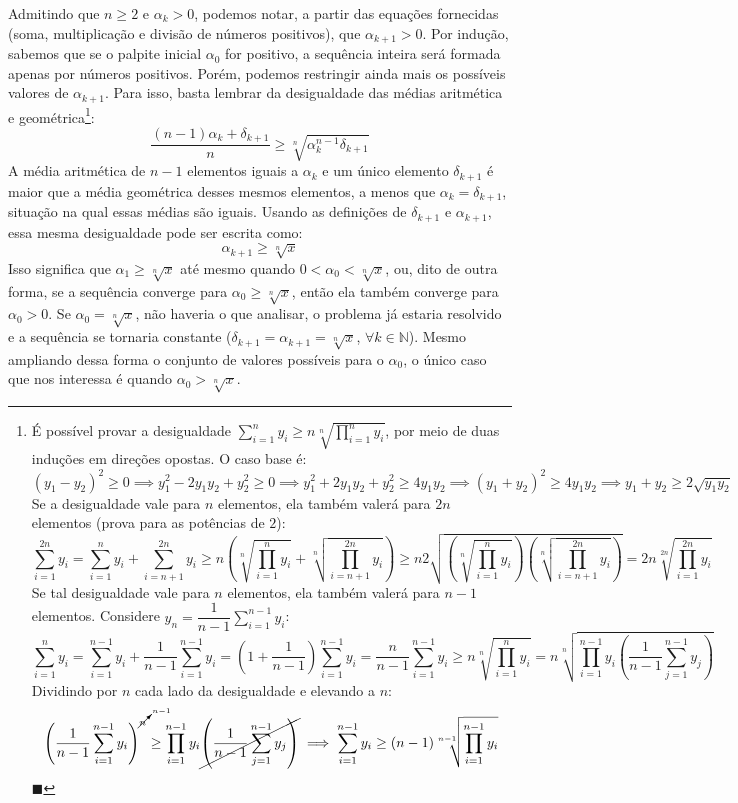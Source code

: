 \documentclass{article}
\begin{document}
Admitindo que $n \ge 2$ e $\alpha_k > 0$,
podemos notar, a partir das equações fornecidas
(soma, multiplicação e divisão de números positivos),
que $\alpha_{k+1} > 0$.
Por indução, sabemos que se o palpite inicial $\alpha_0$ for positivo,
a sequência inteira será formada apenas por números positivos.
Porém, podemos restringir ainda mais
os possíveis valores de $\alpha_{k+1}$.
Para isso, basta lembrar
da desigualdade das médias aritmética e geométrica\footnote{
  É possível provar a desigualdade
  $\sum_{i=1}^n y_i \ge n \sqrt[n]{\prod_{i=1}^n y_i}$,
  por meio de duas induções em direções opostas.
  O caso base é:
  \[
    (y_1 - y_2)^2 \ge 0
    \implies y_1^2 - 2 y_1 y_2 + y_2^2 \ge 0
    \implies y_1^2 + 2 y_1 y_2 + y_2^2 \ge 4 y_1 y_2
    \implies (y_1 + y_2)^2 \ge 4 y_1 y_2
    \implies y_1 + y_2 \ge 2 \sqrt{y_1 y_2}
  \]
  Se a desigualdade vale para $n$ elementos,
  ela também valerá para $2n$ elementos
  (prova para as potências de $2$):
  \[
    \sum_{i=1}^{2n} y_i
    = \sum_{i=1}^{n} y_i + \sum_{i=n+1}^{2n} y_i
    \ge n \left( \sqrt[n]{\prod_{i=1}^n y_i}
               + \sqrt[n]{\prod_{i=n+1}^{2n} y_i} \right)
    \ge n 2 \sqrt{ \left( \sqrt[n]{\prod_{i=1}^n y_i} \right)
                   \left( \sqrt[n]{\prod_{i=n+1}^{2n} y_i} \right) }
    = 2n \sqrt[2n]{\prod_{i=1}^{2n} y_i}
  \]
  Se tal desigualdade vale para $n$ elementos,
  ela também valerá para $n-1$ elementos.
  Considere $y_n = \dfrac{1}{n-1} \sum_{i=1}^{n-1} y_i$:
  \[
    \sum_{i=1}^{n} y_i
    = \sum_{i=1}^{n-1} y_i + \dfrac{1}{n-1} \sum_{i=1}^{n-1} y_i
    = \left( 1 + \dfrac{1}{n-1} \right) \sum_{i=1}^{n-1} y_i
    = \dfrac{n}{n-1} \sum_{i=1}^{n-1} y_i
    \ge n \sqrt[n]{\prod_{i=1}^n y_i}
    = n \sqrt[n]{\prod_{i=1}^{n-1} y_i
                 \left( \dfrac{1}{n-1} \sum_{j=1}^{n-1} y_j \right)}
  \]
  Dividindo por $n$ cada lado da desigualdade e elevando a $n$:
  \[
    \left( \dfrac{1}{n-1}
           \sum_{i=1}^{n-1} y_i \right)^{\cancelto{n-1}{n}}
    \ge \prod_{i=1}^{n-1} y_i
        \cancel{\left( \dfrac{1}{n-1} \sum_{j=1}^{n-1} y_j \right)}
    \implies
    \sum_{i=1}^{n-1} y_i \ge (n-1) \sqrt[n-1]{\prod_{i=1}^{n-1} y_i}
  \]
  \hfill$\blacksquare$
}:
\[
  \dfrac{(n-1) \alpha_k + \delta_{k+1}}{n} \ge
  \sqrt[n]{\alpha_k^{n-1} \delta_{k+1}}
\]
A média aritmética de $n-1$ elementos iguais a $\alpha_k$
e um único elemento $\delta_{k+1}$
é maior que a média geométrica desses mesmos elementos,
a menos que $\alpha_k = \delta_{k+1}$,
situação na qual essas médias são iguais.
Usando as definições de $\delta_{k+1}$ e $\alpha_{k+1}$,
essa mesma desigualdade pode ser escrita como:
\[\alpha_{k+1} \ge \sqrt[n]{x}\]
Isso significa que $\alpha_1 \ge \sqrt[n]{x}$
até mesmo quando $0 < \alpha_0 < \sqrt[n]{x}$,
ou, dito de outra forma,
se a sequência converge para $\alpha_0 \ge \sqrt[n]{x}$,
então ela também converge para $\alpha_0 > 0$.
Se $\alpha_0 = \sqrt[n]{x}$, não haveria o que analisar,
o problema já estaria resolvido
e a sequência se tornaria constante
($\delta_{k+1} = \alpha_{k+1} = \sqrt[n]{x}$,
 $\forall k \in \mathds{N}$).
Mesmo ampliando dessa forma
o conjunto de valores possíveis para o $\alpha_0$,
o único caso que nos interessa é quando $\alpha_0 > \sqrt[n]{x}$.
\end{document}
